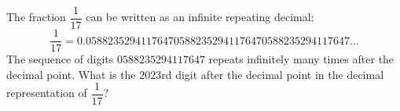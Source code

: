 The fraction $\dfrac{1}{17}$ can be written as an infinite repeating decimal: \[\dfrac{1}{17}=0.058823529411764705882352941176470588235294117647\ldots\]The sequence of digits $0588235294117647$ repeats infinitely many times after the decimal point. What is the $2023$rd digit after the decimal point in the decimal representation of $\dfrac{1}{17}$?
